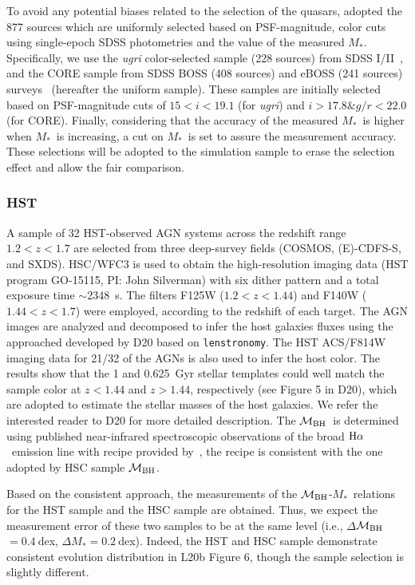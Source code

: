 \documentclass[twocolumn]{aastex631}
\def\smass{{$M_*$}}
\def\halpha{${\rm H}\alpha$}
\def\mbh{$\mathcal M_{\rm BH}$}
\begin{document}
To avoid any potential biases related to the selection of the quasars, \citet[][hereafter, L21b]{2021arXiv210902751L} adopted the 877 sources which are uniformly selected based on PSF-magnitude, color cuts using single-epoch SDSS photometries and the value of the measured \smass. Specifically, we use the {\it ugri} color-selected sample (228 sources) from SDSS I/II~\citep{Richards2002}, and the CORE sample from SDSS BOSS (408 sources) and eBOSS (241 sources) surveys~\citep{Ross2013, Myers2015} (hereafter the uniform sample). These samples are initially selected based on PSF-magnitude cuts of $15 < i < 19.1$ (for {\it ugri}) and $i > 17.8 \& g/r < 22.0$ (for CORE). Finally, considering that the accuracy of the measured \smass\ is higher when \smass\ is increasing, a cut on \smass\ is set to assure the measurement accuracy. These selections will be adopted to the simulation sample to erase the selection effect and allow the fair comparison.

\subsubsection{HST}
A sample of 32 HST-observed AGN systems across the redshift range $1.2<z<1.7$ are selected from three deep-survey fields (COSMOS, (E)-CDFS-S, and SXDS). HSC/WFC3 is used to obtain the high-resolution imaging data (HST program GO-15115, PI: John Silverman) with six dither pattern and a total exposure time $\sim$2348~s. The filters F125W ($1.2<z<1.44$) and F140W ($1.44<z<1.7$) were employed, according to the redshift of each target.  The AGN images are analyzed and decomposed to infer the host galaxies fluxes using the approached developed by D20 based on {\tt lenstronomy}. The HST ACS/F814W imaging data for 21/32 of the AGNs is also used to infer the host color. The results show that the 1 and 0.625~Gyr stellar templates could well match the sample color at $z<1.44$ and $z>1.44$, respectively (see Figure 5 in D20), which are adopted to estimate the stellar masses of the host galaxies. We refer the interested reader to D20 for more detailed description. 
The \mbh\ is determined using published near-infrared spectroscopic observations of the broad \halpha\ emission line with recipe provided by~\citep{Vestergaard2006}, the recipe is consistent with the one adopted by HSC sample \mbh. 

Based on the consistent approach, the measurements of the \mbh-\smass\ relations for the HST sample and the HSC sample are obtained. Thus, we expect the measurement error of these two samples to be at the same level (i.e., $\Delta$\mbh$=0.4~$dex, $\Delta$\smass$=0.2~$dex). 
Indeed, the HST and HSC sample demonstrate consistent evolution distribution in L20b Figure 6, though the sample selection is slightly different.
\end{document}
